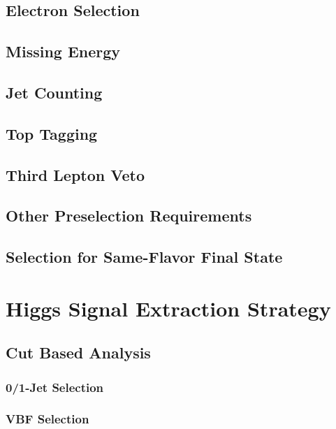 \documentclass{cmspaper}
\begin{document}
   \subsection{Electron Selection} 
     \label{sec:sel_electrons}
     
   \subsection{Missing Energy} 
     \label{sec:sel_met}
     
   \subsection{Jet Counting} 
     \label{sec:sel_jets}
     
  \subsection{Top Tagging}
     \label{sec:sel_toptag}
     
   \subsection{Third Lepton Veto}
     \label{sec:sel_lepveto}
     
   \subsection{Other Preselection Requirements}
     \label{sec:sel_other}
     
   \subsection{Selection for Same-Flavor Final State}
     \label{sec:sel_sf}
     

\section{Higgs Signal Extraction Strategy}
   
   \label{sec:signal_selection}
   \subsection{Cut Based Analysis}
     \label{sec:anal_cutbased}
    \subsubsection{0/1-Jet Selection}
      \label{sec:sel_zerojet}
      
     \subsubsection{VBF Selection}
       \label{sec:sel_vbf}
       
\end{document}
